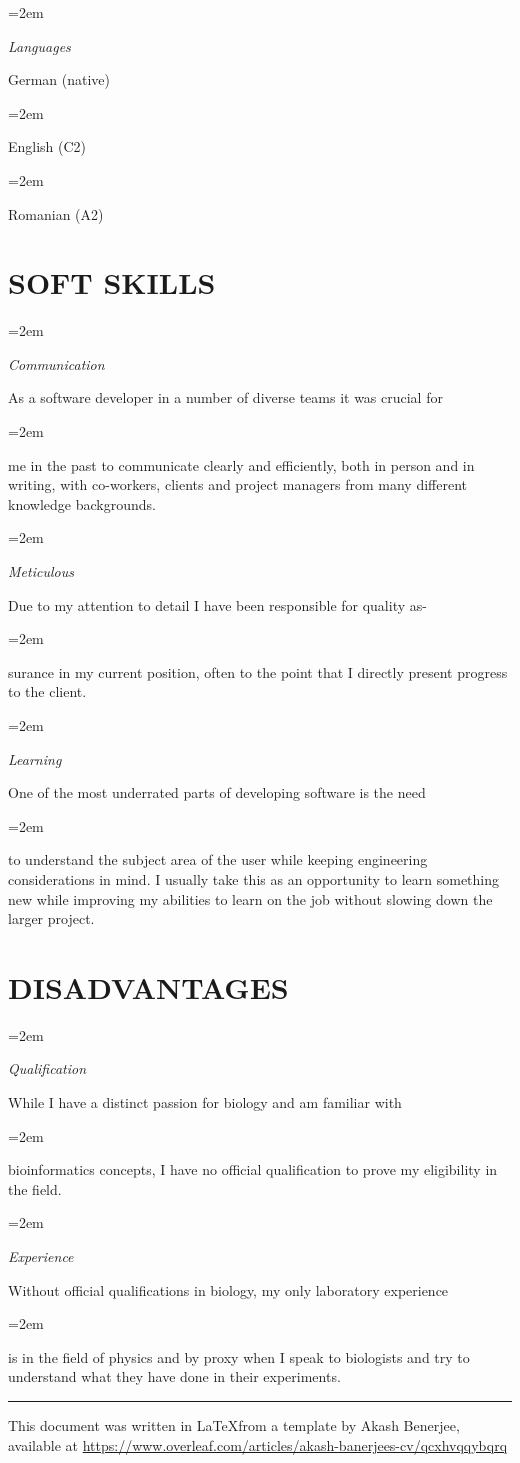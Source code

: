 \documentclass[paper=a4,fontsize=11pt]{scrartcl} %
\newlength{\spacebox}
\newcommand{\sepspace}{\vspace*{1em}}		%
\newcommand{\NewPart}[1]{\section*{\uppercase{#1}}}
\newcommand{\PersonalEntry}[2]{
		\noindent\hangindent=2em\hangafter=0 %
		\parbox{\spacebox}{        %
		\textit{#1}}		       %
		\hspace{1.5em} #2 \par}    %
\newcommand{\SkillsEntry}[2]{      %
		\noindent\hangindent=2em\hangafter=0 %
		\parbox{\spacebox}{        %
		\textit{#1}}			   %
		\hspace{1.5em} \parbox{6\spacebox}{#2} \par}    %
\begin{document}
\SkillsEntry{Languages}{German (native)}
\SkillsEntry{}{English (C2)}
\SkillsEntry{}{Romanian (A2)}
\sepspace


\NewPart{Soft Skills}{}

\SkillsEntry{Communication}{As a software developer in a number of diverse teams it was crucial for }
\vspace{3pt}
\SkillsEntry{}{me in the past to communicate clearly and efficiently, both in person and in writing, with co-workers, clients and project managers from many different knowledge backgrounds.}
\sepspace

\SkillsEntry{Meticulous}{Due to my attention to detail I have been responsible for quality as-}
\vspace{3pt}
\SkillsEntry{}{surance in my current position, often to the point that I directly present progress to the client.}
\sepspace

\SkillsEntry{Learning}{One of the most underrated parts of developing software is the need }
\vspace{3pt}
\SkillsEntry{}{to understand the subject area of the user while keeping engineering considerations in mind. I usually take this as an opportunity to learn something new while improving my abilities to learn on the job without slowing down the larger project.}
\sepspace

\NewPart{Disadvantages}

\SkillsEntry{Qualification}{While I have a distinct passion for biology and am familiar with } %
\vspace{3pt}
\SkillsEntry{}{bioinformatics concepts, I have no official qualification to prove my eligibility in the field.}
\sepspace

\SkillsEntry{Experience}{Without official qualifications in biology, my only laboratory experience } %
\vspace{3pt}
\SkillsEntry{}{is in the field of physics and by proxy when I speak to biologists and try to understand what they have done in their experiments. }
\sepspace


\vfill
\small
\centering
\rule{\linewidth}{0.4pt}
This document was written in \LaTeX\space from a template by Akash Benerjee, available at \url{https://www.overleaf.com/articles/akash-banerjees-cv/qcxhvqqybqrq}
% 
\end{document}
